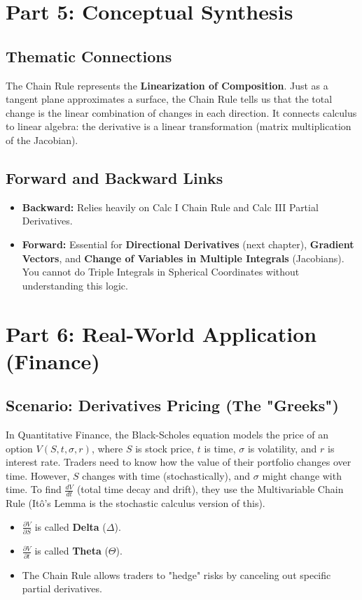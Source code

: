 \documentclass[11pt, letterpaper]{article}
\theoremstyle{definition}
\begin{document}
\section{Part 5: Conceptual Synthesis}

\subsection{Thematic Connections}
The Chain Rule represents the \textbf{Linearization of Composition}. Just as a tangent plane approximates a surface, the Chain Rule tells us that the total change is the linear combination of changes in each direction. It connects calculus to linear algebra: the derivative is a linear transformation (matrix multiplication of the Jacobian).

\subsection{Forward and Backward Links}
\begin{itemize}
    \item \textbf{Backward:} Relies heavily on Calc I Chain Rule and Calc III Partial Derivatives.
    \item \textbf{Forward:} Essential for \textbf{Directional Derivatives} (next chapter), \textbf{Gradient Vectors}, and \textbf{Change of Variables in Multiple Integrals} (Jacobians). You cannot do Triple Integrals in Spherical Coordinates without understanding this logic.
\end{itemize}

\section{Part 6: Real-World Application (Finance)}

\subsection{Scenario: Derivatives Pricing (The "Greeks")}
In Quantitative Finance, the Black-Scholes equation models the price of an option $V(S, t, \sigma, r)$, where $S$ is stock price, $t$ is time, $\sigma$ is volatility, and $r$ is interest rate.
Traders need to know how the value of their portfolio changes over time. However, $S$ changes with time (stochastically), and $\sigma$ might change with time.
To find $\frac{dV}{dt}$ (total time decay and drift), they use the Multivariable Chain Rule (Itô's Lemma is the stochastic calculus version of this).
\begin{itemize}
    \item $\frac{\partial V}{\partial S}$ is called \textbf{Delta} ($\Delta$).
    \item $\frac{\partial V}{\partial t}$ is called \textbf{Theta} ($\Theta$).
    \item The Chain Rule allows traders to "hedge" risks by canceling out specific partial derivatives.
\end{itemize}
\end{document}
